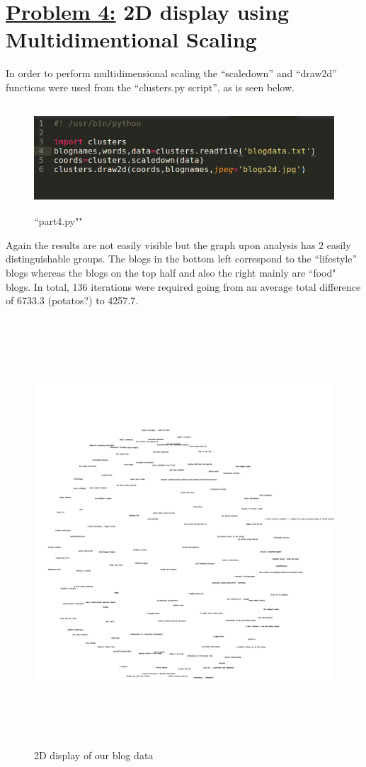 \documentclass{article}
\begin{document}
\section*{{\underline{\huge {Problem 4:}}}  2D display using Multidimentional Scaling}
In order to perform multidimensional scaling the ``scaledown'' and  ``draw2d'' functions were used from the ``clusters.py script'', as is seen below.

\begin{figure}[H]
 \centering
 	\includegraphics[height=4cm]{p4.png}
  \caption{``part4.py""}
\end{figure}

Again the results are not easily visible but the graph upon analysis has 2 easily distinguishable groups. The  blogs in the bottom left correspond to the ``lifestyle'' blogs whereas the blogs on the top half and also the right mainly are ``food"  blogs. In total, 136 iterations were required going from an average total difference of 6733.3 (potatos?) to 4257.7.

\begin{figure}[H]
 \centering
 	\includegraphics[height=16cm]{MDS.jpg}
  \caption{2D display of our blog data}
\end{figure}


\end{document}
